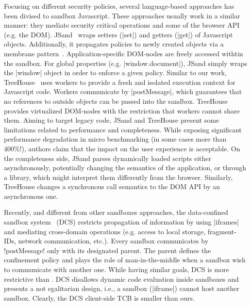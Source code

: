 Focusing on different security policies, several language-based approaches has
been divised to sandbox Javascript.  These approaches usually work in a similar
manner: they mediate security critical operations and some of the browser API
(e.g. the DOM).
JSand~\cite{Agten:2012:JCC} wraps setters (\js|set|) and getters (\js|get|) of Javascript
objects. Additionally, it propagates policies to newly created objects via a
membrane pattern~\cite{RobustComposition}. Application-specific DOM-nodes are freely accessed
withtin the sandbox. For global properties (e.g. \js|window.document|), JSand
simply wraps the \js|window| object in order to enforce a given policy.
Similar to our work, TreeHouse~\cite{Ingram:2012} uses workers to provide a
fresh and isolated execution context for Javascript code. Workers communicate by
\js|postMessage|, which guarantees that no references to outside objects can be
passed into the sandbox. TreeHouse provides virtualized DOM-nodes with the
restriction that workers cannot share them.
Aiming to target legacy code, JSand and TreeHouse present some limitations
related to performance and completeness.
While exposing significant performance degradation in micro benchmarking (in
some cases more than 400\%!), authors claim that the impact on the user
experience is acceptable.
On the completeness side, JSand parses dynamically loaded scripts either
asynchronously, potentially changing the semantics of the application, or
through a library, which might interpret them differently from the
browser. Similarly, TreeHouse changes a synchronous call semantics to the DOM
API by an asynchronous one.


Recently, and different from other sandboxes approaches, the data-confined
sandbox system~\cite{Akhawe2013} (DCS) restricts propagation of information by using
\js|iframes| and mediating cross-domain operations (e.g. access to local
storage, fragment-IDs, network communication, etc.).  Every sandbox communicates
by \js!postMessage! only with its designated parent. The parent defines the
confinement policy and plays the role of man-in-the-middle when a sandbox wish
to communicate with another one. While having similar goals, DCS is more
restrictive than \sys. DCS disallows dynamic code evaluation inside sandboxes
and presents a not egalitarian design, i.e., a sandbox (\js|iframe|) cannot host
another sandbox. Clearly, the DCS client-side TCB is smaller than ours.

